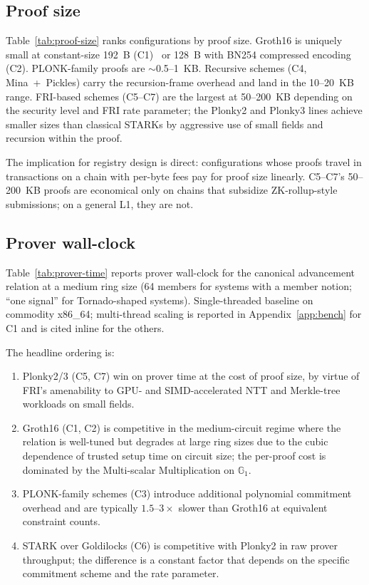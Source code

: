 

\subsection{Proof size}
\label{sec:analysis-size}

Table~\ref{tab:proof-size} ranks configurations by proof size.
Groth16 is uniquely small at constant-size 192~B
(C1)~\cite{groth-2016-onpairing} or 128~B with BN254 compressed
encoding (C2). PLONK-family proofs are $\sim$0.5--1~KB. Recursive
schemes (C4, Mina~+~Pickles) carry the recursion-frame overhead and
land in the 10--20~KB range. FRI-based schemes (C5--C7) are the
largest at 50--200~KB depending on the security level and FRI rate
parameter; the Plonky2 and Plonky3 lines achieve smaller sizes than
classical STARKs by aggressive use of small fields and recursion
within the proof.



The implication for registry design is direct: configurations whose
proofs travel in transactions on a chain with per-byte fees pay for
proof size linearly. C5--C7's 50--200~KB proofs are economical only
on chains that subsidize ZK-rollup-style submissions; on a general
L1, they are not.

\subsection{Prover wall-clock}
\label{sec:analysis-prover}

Table~\ref{tab:prover-time} reports prover wall-clock for the
canonical advancement relation at a medium ring size (64 members for
systems with a member notion; ``one signal'' for Tornado-shaped
systems). Single-threaded baseline on commodity x86\_64; multi-thread
scaling is reported in Appendix~\ref{app:bench} for C1 and is cited
inline for the others.

The headline ordering is:
\begin{enumerate}
  \item Plonky2/3 (C5, C7) win on prover time at the cost of proof
    size, by virtue of FRI's amenability to GPU- and SIMD-accelerated
    NTT and Merkle-tree workloads on small fields.
  \item Groth16 (C1, C2) is competitive in the medium-circuit regime
    where the relation is well-tuned but degrades at large ring sizes
    due to the cubic dependence of trusted setup time on circuit
    size; the per-proof cost is dominated by the Multi-scalar
    Multiplication on $\mathbb{G}_1$.
  \item PLONK-family schemes (C3) introduce additional polynomial
    commitment overhead and are typically $1.5$--$3\times$ slower
    than Groth16 at equivalent constraint counts.
  \item STARK over Goldilocks (C6) is competitive with Plonky2 in raw
    prover throughput; the difference is a constant factor that
    depends on the specific commitment scheme and the rate parameter.
\end{enumerate}

